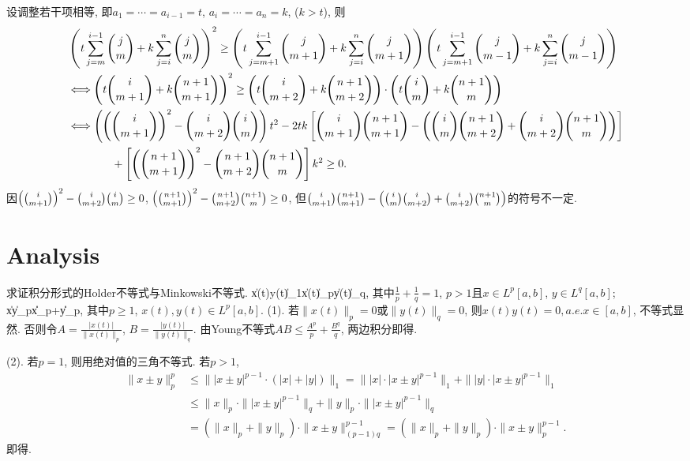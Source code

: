 设调整若干项相等, 即$a_1=\cdots=a_{i-1}=t$, $a_i=\cdots=a_n=k$, ($k>t$), 则
\begin{align*}
 &\left(t\sum_{j=m}^{i-1}\binom{j}{m}+k\sum_{j=i}^n\binom{j}{m}\right)^2\ge\left(t\sum_{j=m+1}^{i-1}\binom{j}{m+1}+k\sum_{j=i}^n\binom{j}{m+1}\right)\left(t\sum_{j=m+1}^{i-1}\binom{j}{m-1}+k\sum_{j=i}^n\binom{j}{m-1}\right)\\
 &\Longleftrightarrow\left(t\binom{i}{m+1}+k\binom{n+1}{m+1}\right)^2\ge\left(t\binom{i}{m+2}+k\binom{n+1}{m+2}\right)\cdot\left(t\binom{i}{m}+k\binom{n+1}{m}\right)\\
 &\Longleftrightarrow\left(\left(\binom{i}{m+1}\right)^2-\binom{i}{m+2}\binom{i}{m}\right)t^2-2tk\left[\binom{i}{m+1}\binom{n+1}{m+1}-\left(\binom{i}{m}\binom{n+1}{m+2}+\binom{i}{m+2}\binom{n+1}{m}\right)\right]\\
  &\qquad\qquad+\left[\left(\binom{n+1}{m+1}\right)^2-\binom{n+1}{m+2}\binom{n+1}{m}\right]k^2\ge0.
\end{align*}
因$\left(\binom{i}{m+1}\right)^2-\binom{i}{m+2}\binom{i}{m}\ge0$, $\left(\binom{n+1}{m+1}\right)^2-\binom{n+1}{m+2}\binom{n+1}{m}\ge0$,
但$\binom{i}{m+1}\binom{n+1}{m+1}-\left(\binom{i}{m}\binom{i}{m+2}+\binom{i}{m+2}\binom{n+1}{m}\right)$的符号不一定.
\ea

\section{Analysis}
\bq{}{}
求证积分形式的Holder不等式与Minkowski不等式.
\bee
\|x(t)y(t)\|_1\le\|x(t)\|_{p}\cdot\|y(t)\|_q,
\eee
其中$\frac1p+\frac1q=1$, $p>1$且$x\in L^p[a,b]$, $y\in L^q[a,b]$;
\bee
\|x\pm y\|_p\le\|x\|_p+\|y\|_p,
\eee
其中$p\ge 1$, $x(t),y(t)\in L^p[a,b]$.
\eq
\ba
(1). 若$\|x(t)\|_p=0$或$\|y(t)\|_q=0$, 则$x(t)y(t)=0, a.e. x\in[a,b]$, 不等式显然. 否则令$A=\frac{|x(t)|}{\|x(t)\|_p}$, $B=\frac{|y(t)|}{\|y(t)\|_q}$.
由Young不等式$AB\le\frac{A^p}{p}+\frac{B^q}{q}$, 两边积分即得.

(2). 若$p=1$, 则用绝对值的三角不等式. 若$p>1$, 
\begin{align*}
 \|x\pm y\|_p^p & \le \||x\pm y|^{p-1}\cdot(|x|+|y|)\|_1=\||x|\cdot|x\pm y|^{p-1}\|_1+\||y|\cdot|x\pm y|^{p-1}\|_1\\
  & \le\|x\|_p\cdot\||x\pm y|^{p-1}\|_q+\|y\|_p\cdot\||x\pm y|^{p-1}\|_q\\
  & = (\|x\|_p+\|y\|_p)\cdot\|x\pm y\|_{(p-1)q}^{p-1}=(\|x\|_p+\|y\|_p)\cdot\|x\pm y\|_p^{p-1}.
\end{align*}
即得.
\ea